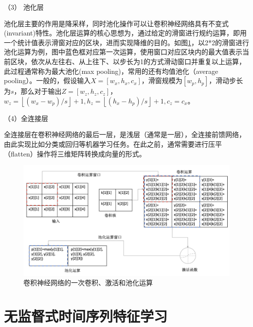 （3） 池化层

池化层主要的作用是降采样，同时池化操作可以让卷积神经网络具有不变式(invariant)特性。池化层运算的核心思想为，通过给定的滑窗进行规约运算，即用一个统计值表示滑窗对应的区块，进而实现降维的目的。如图\ref{fig:gan-cnn-ops}，以2*2的滑窗进行池化运算为例，图中蓝色框对应第一次运算，使用窗口对应区块内的最大值表示当前区块，依次从左往右、从上往下、以步长为1的方式滑动窗口并重复以上运算，此过程通常称为最大池化(max pooling)，常用的还有均值池化（average pooling）。一般的，假设输入$X=[w_{x}, h_{x}, c_{x}]$，滑窗规模为$[w_{p}, h_{p}]$，滑动步长为$s$，那么对于输出$Z=[w_{z}, h_{z}, c_{z}]$，$w_{z} = \left \lfloor (w_{x}-w_{p})/s \right \rfloor+1, h_{z} = \left \lfloor (h_{x}-h_{p})/s \right \rfloor+1, c_{z}=c_{x}$。

（4）全连接层

 全连接层在卷积神经网络的最后一层，是浅层（通常是一层），全连接前馈网络，由此实现比如分类或回归等机器学习任务。在此之前，通常需要进行压平（flatten）操作将三维矩阵转换成向量的形式。

\begin{figure}[H]
\centering
\includegraphics[scale=0.5]{figures/gan-cnn-ops.png}
\caption{卷积神经网络的一次卷积、激活和池化运算}
\label{fig:gan-cnn-ops}
\end{figure}

\section{无监督式时间序列特征学习}
\label{tsgan-model}
%
%


